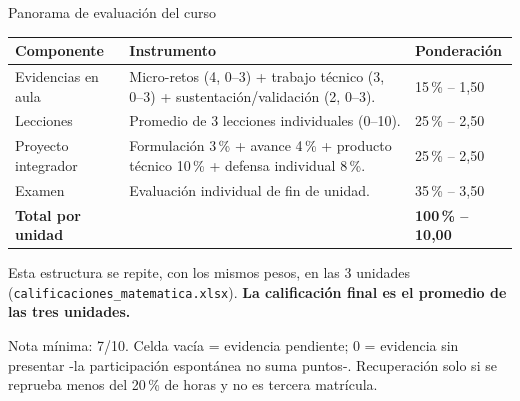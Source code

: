 \documentclass[aspectratio=169,11pt]{beamer}
\begin{document}
\begin{frame}{Panorama de evaluación del curso}
\scriptsize
\centering
\renewcommand{\arraystretch}{1.05}
\begin{tabularx}{\textwidth}{L{2.6cm}Y C{1.8cm}}
\toprule
\textbf{Componente} & \textbf{Instrumento} & \textbf{Ponderación} \\
\midrule
Evidencias en aula & Micro-retos (4, 0--3) + trabajo técnico (3, 0--3) + sustentación/validación (2, 0--3). & 15\,\% -- 1,50 \\
Lecciones & Promedio de 3 lecciones individuales (0--10). & 25\,\% -- 2,50 \\
Proyecto integrador & Formulación 3\,\% + avance 4\,\% + producto técnico 10\,\% + defensa individual 8\,\%. & 25\,\% -- 2,50 \\
Examen & Evaluación individual de fin de unidad. & 35\,\% -- 3,50 \\
\midrule
\textbf{Total por unidad} & & \textbf{100\,\% -- 10,00} \\
\bottomrule
\end{tabularx}
\vspace{0.06cm}
\begin{keybox}[top=2pt,bottom=2pt]
Esta estructura se repite, con los mismos pesos, en las 3 unidades (\texttt{calificaciones\_matematica.xlsx}). \textbf{La calificación final es el promedio de las tres unidades.}
\end{keybox}
\vspace{0.03cm}
\begin{warnbox}[top=2pt,bottom=2pt]
Nota mínima: 7/10. Celda vacía = evidencia pendiente; 0 = evidencia sin presentar -la participación espontánea no suma puntos-. Recuperación solo si se reprueba menos del 20\,\% de horas y no es tercera matrícula.
\end{warnbox}
\end{frame}
\end{document}
